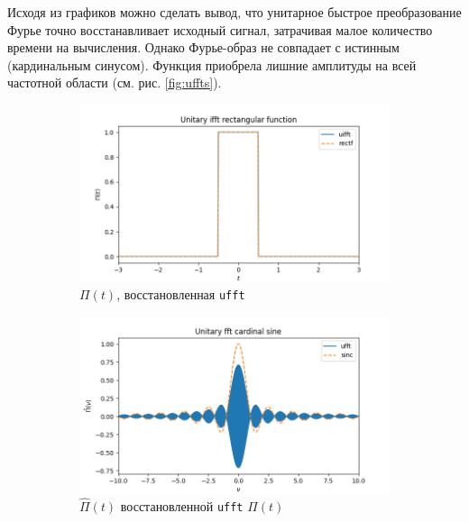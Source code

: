 \documentclass[a4paper, 12pt]{article}
\begin{document}
    Исходя из графиков можно сделать вывод, что унитарное быстрое преобразование Фурье точно восстанавливает
    исходный сигнал, затрачивая малое количество времени на вычисления. Однако Фурье-образ не совпадает с истинным (кардинальным синусом).
    Функция приобрела лишние амплитуды на всей частотной области  (см. рис. \ref{fig:uffts}).
    \begin{figure}[H]
        \centering
        \begin{subfigure}{0.45\textwidth}
            \centering
            \includegraphics[width=\linewidth]{uifft.png}
            \caption{$\Pi(t)$, восстановленная \texttt{ufft}}
            \label{fig:uifft}
        \end{subfigure}
        \hspace{5mm}
        \begin{subfigure}{0.45\textwidth}
            \centering
            \includegraphics[width=\linewidth]{ufft.png}
            \caption{$\hat{\Pi}(t)$ восстановленной \texttt{ufft} $\Pi(t)$}
            \label{fig:ufft}
        \end{subfigure}
        \begin{subfigure}{0.45\textwidth}

\end{subfigure}
\end{figure}
\end{document}
